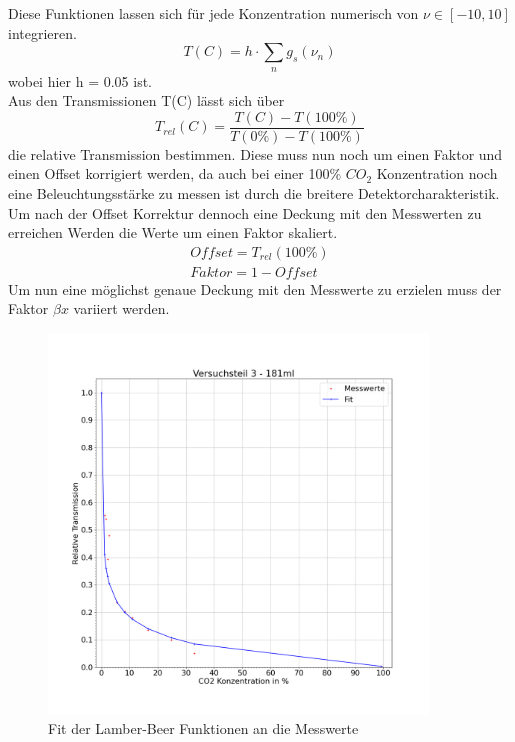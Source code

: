 \documentclass{article}
\begin{document}
            Diese Funktionen lassen sich für jede Konzentration numerisch von $\nu \in [-10,10]$
            integrieren.
            \begin{equation}
                T(C) = h \cdot \sum_{n} g_s(\nu_n)
            \end{equation}
            wobei hier h = 0.05 ist.\\
            Aus den Transmissionen T(C) lässt sich über
            \begin{equation}
                T_{rel}(C) = \frac{T(C)-T(100\%)}{T(0\%)-T(100\%)}
            \end{equation}
            die relative Transmission bestimmen. Diese muss nun noch um einen Faktor
            und einen Offset korrigiert werden, da auch bei einer 100\% $CO_2$ Konzentration
            noch eine Beleuchtungsstärke zu messen ist durch die breitere Detektorcharakteristik.
            Um nach der Offset Korrektur dennoch eine Deckung mit den Messwerten zu erreichen
            Werden die Werte um einen Faktor skaliert.
            \begin{equation}
                \begin{aligned}
                    Offset = T_{rel}(100\%)\\
                    Faktor = 1-Offset
                \end{aligned}
            \end{equation}
            Um nun eine möglichst genaue Deckung mit den Messwerte zu erzielen muss der
            Faktor $\beta x $ variiert werden.
            \begin{figure}[H]
                \includegraphics[width=0.9\textwidth]{Daten/KonzPlot.png}
                \caption{Fit der Lamber-Beer Funktionen an die Messwerte} 
            \end{figure}
\end{document}
